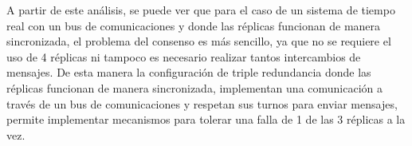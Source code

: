 A partir de este análisis, se puede ver que para el caso de un sistema de tiempo real con un bus de comunicaciones y donde las réplicas funcionan de manera sincronizada, el problema del consenso es más sencillo, ya que no se requiere el uso de 4 réplicas ni tampoco es necesario realizar tantos intercambios de mensajes. 
De esta manera la configuración de triple redundancia donde las réplicas funcionan de manera sincronizada, implementan una comunicación a través de un bus de comunicaciones y respetan sus turnos para enviar mensajes, permite implementar mecanismos para tolerar una falla %
de 1 de las 3 réplicas a la vez.




